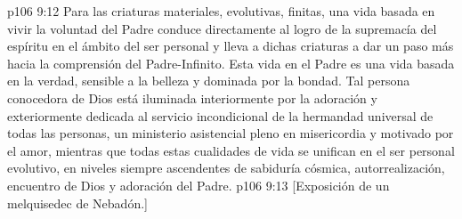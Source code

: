 \vs p106 9:12 Para las criaturas materiales, evolutivas, finitas, una vida basada en vivir la voluntad del Padre conduce directamente al logro de la supremacía del espíritu en el ámbito del ser personal y lleva a dichas criaturas a dar un paso más hacia la comprensión del Padre\hyp{}Infinito. Esta vida en el Padre es una vida basada en la verdad, sensible a la belleza y dominada por la bondad. Tal persona conocedora de Dios está iluminada interiormente por la adoración y exteriormente dedicada al servicio incondicional de la hermandad universal de todas las personas, un ministerio asistencial pleno en misericordia y motivado por el amor, mientras que todas estas cualidades de vida se unifican en el ser personal evolutivo, en niveles siempre ascendentes de sabiduría cósmica, autorrealización, encuentro de Dios y adoración del Padre.
\vsetoff
\vs p106 9:13 [Exposición de un melquisedec de Nebadón.]
